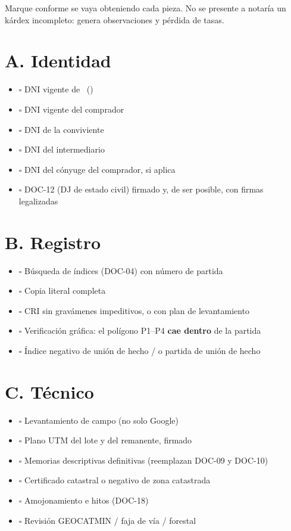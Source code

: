 \documentclass[12pt,a4paper]{article}
\begin{document}


\noindent Marque conforme se vaya obteniendo cada pieza. No se presente a notaría un kárdex incompleto: genera observaciones y pérdida de tasas.

\section*{A. Identidad}
\begin{itemize}[leftmargin=0.9cm]
\item $\square$ DNI vigente de \VendedorNombreCompleto\ (\VendedorDNI)
\item $\square$ DNI vigente del comprador \CompradorNombreCompleto
\item $\square$ DNI de la conviviente \ConvivienteNombre
\item $\square$ DNI del intermediario \IntermediarioNombre
\item $\square$ DNI del cónyuge del comprador, si aplica
\item $\square$ DOC-12 (DJ de estado civil) firmado y, de ser posible, con firmas legalizadas
\end{itemize}

\section*{B. Registro}
\begin{itemize}[leftmargin=0.9cm]
\item $\square$ Búsqueda de índices (DOC-04) con número de partida
\item $\square$ Copia literal completa
\item $\square$ CRI sin gravámenes impeditivos, o con plan de levantamiento
\item $\square$ Verificación gráfica: el polígono P1--P4 \textbf{cae dentro} de la partida
\item $\square$ Índice negativo de unión de hecho / o partida de unión de hecho
\end{itemize}

\section*{C. Técnico}
\begin{itemize}[leftmargin=0.9cm]
\item $\square$ Levantamiento de campo (no solo Google)
\item $\square$ Plano UTM del lote y del remanente, firmado
\item $\square$ Memorias descriptivas definitivas (reemplazan DOC-09 y DOC-10)
\item $\square$ Certificado catastral o negativo de zona catastrada
\item $\square$ Amojonamiento e hitos (DOC-18)
\item $\square$ Revisión GEOCATMIN / faja de vía / forestal
\end{itemize}
\end{document}
